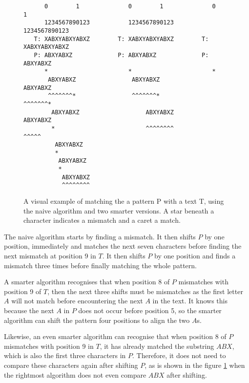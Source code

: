 \begin{figure}[t]
\begin{verbatim}
      0        1              0        1              0        1   
      1234567890123           1234567890123           1234567890123
   T: XABXYABXYABXZ        T: XABXYABXYABXZ        T: XABXYABXYABXZ
   P: ABXYABXZ             P: ABXYABXZ             P: ABXYABXZ     
      *                       *                       *            
       ABXYABXZ                ABXYABXZ                ABXYABXZ    
       ^^^^^^^*                ^^^^^^^*                ^^^^^^^*    
        ABXYABXZ                   ABXYABXZ                ABXYABXZ
        *                          ^^^^^^^^                   ^^^^^
         ABXYABXZ                                                  
         *                                                         
          ABXYABXZ                                                 
          *                                                        
           ABXYABXZ                                                
           ^^^^^^^^                                                
\end{verbatim}
    \caption{A visual example of matching the a pattern P with a text T, using the naive algorithm and two smarter versions. A star beneath a character indicates a mismatch and a caret a match. }
    \label{fig:stringmatchingexample}
\end{figure}

The naive algorithm starts by finding a mismatch. It then shifts $P$ by one position, immediately and matches the next seven characters before finding the next mismatch at position 9 in $T$. It then shifts $P$ by one position and finds a mismatch three times before finally matching the whole pattern. 

A smarter algorithm recognises that when position 8 of $P$ mismatches with position 9 of $T$, then the next three shifts must be mismatches as the first letter $A$ will not match before encountering the next $A$ in the text. It knows this because the next $A$ in $P$ does not occur before position 5, so the smarter algorithm can shift the pattern four positions to align the two $A$s. 

Likewise, an even smarter algorithm can recognise that when position 8 of $P$ mismatches with position 9 in $T$, it has already matched the substring $ABX$, which is also the first three characters in $P$. Therefore, it does not need to compare these characters again after shifting $P$, as is shown in the figure \ref{fig:stringmatchingexample} when the rightmost algorithm does not even compare $ABX$ after shifting. 

